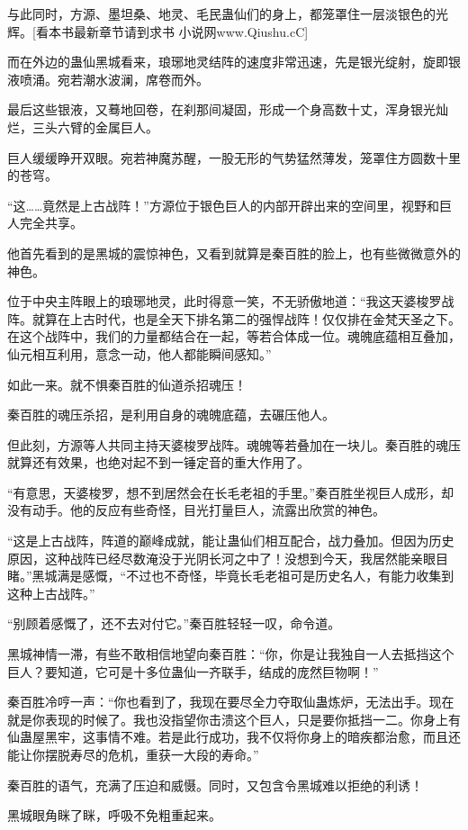 \begin{this_body}
与此同时，方源、墨坦桑、地灵、毛民蛊仙们的身上，都笼罩住一层淡银色的光辉。[看本书最新章节请到求书 小说网www.Qiushu.cC]

而在外边的蛊仙黑城看来，琅琊地灵结阵的速度非常迅速，先是银光绽射，旋即银液喷涌。宛若潮水波澜，席卷而外。

最后这些银液，又蓦地回卷，在刹那间凝固，形成一个身高数十丈，浑身银光灿烂，三头六臂的金属巨人。

巨人缓缓睁开双眼。宛若神魔苏醒，一股无形的气势猛然薄发，笼罩住方圆数十里的苍穹。

“这……竟然是上古战阵！”方源位于银色巨人的内部开辟出来的空间里，视野和巨人完全共享。

他首先看到的是黑城的震惊神色，又看到就算是秦百胜的脸上，也有些微微意外的神色。

位于中央主阵眼上的琅琊地灵，此时得意一笑，不无骄傲地道：“我这天婆梭罗战阵。就算在上古时代，也是全天下排名第二的强悍战阵！仅仅排在金梵天圣之下。在这个战阵中，我们的力量都结合在一起，等若合体成一位。魂魄底蕴相互叠加，仙元相互利用，意念一动，他人都能瞬间感知。”

如此一来。就不惧秦百胜的仙道杀招魂压！

秦百胜的魂压杀招，是利用自身的魂魄底蕴，去碾压他人。

但此刻，方源等人共同主持天婆梭罗战阵。魂魄等若叠加在一块儿。秦百胜的魂压就算还有效果，也绝对起不到一锤定音的重大作用了。

“有意思，天婆梭罗，想不到居然会在长毛老祖的手里。”秦百胜坐视巨人成形，却没有动手。他的反应有些奇怪，目光打量巨人，流露出欣赏的神色。

“这是上古战阵，阵道的巅峰成就，能让蛊仙们相互配合，战力叠加。但因为历史原因，这种战阵已经尽数淹没于光阴长河之中了！没想到今天，我居然能亲眼目睹。”黑城满是感慨，“不过也不奇怪，毕竟长毛老祖可是历史名人，有能力收集到这种上古战阵。”

“别顾着感慨了，还不去对付它。”秦百胜轻轻一叹，命令道。

黑城神情一滞，有些不敢相信地望向秦百胜：“你，你是让我独自一人去抵挡这个巨人？要知道，它可是十多位蛊仙一齐联手，结成的庞然巨物啊！”

秦百胜冷哼一声：“你也看到了，我现在要尽全力夺取仙蛊炼炉，无法出手。现在就是你表现的时候了。我也没指望你击溃这个巨人，只是要你抵挡一二。你身上有仙蛊屋黑牢，这事情不难。若是此行成功，我不仅将你身上的暗疾都治愈，而且还能让你摆脱寿尽的危机，重获一大段的寿命。”

秦百胜的语气，充满了压迫和威慑。同时，又包含令黑城难以拒绝的利诱！

黑城眼角眯了眯，呼吸不免粗重起来。


\end{this_body}

